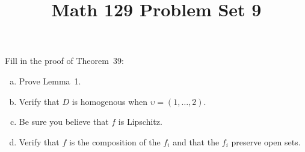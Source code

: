 \documentclass[11pt,letterpaper]{article}
\title{\textbf{Math 129 Problem Set 9}}
\begin{document}
\maketitle

\begin{cproblem}{6.1}
    Fill in the proof of Theorem~39:
    \begin{enumerate}[(a)]
        \item Prove Lemma~1.
        \item Verify that $D$ is homogenous when $\upsilon = (1,\ldots,2)$.
        \item Be sure you believe that $f$ is Lipschitz. 
        \item Verify that $f$ is the composition of the $f_i$ and that the $f_i$ preserve open sets.
    \end{enumerate}
\end{cproblem}
\end{document}
